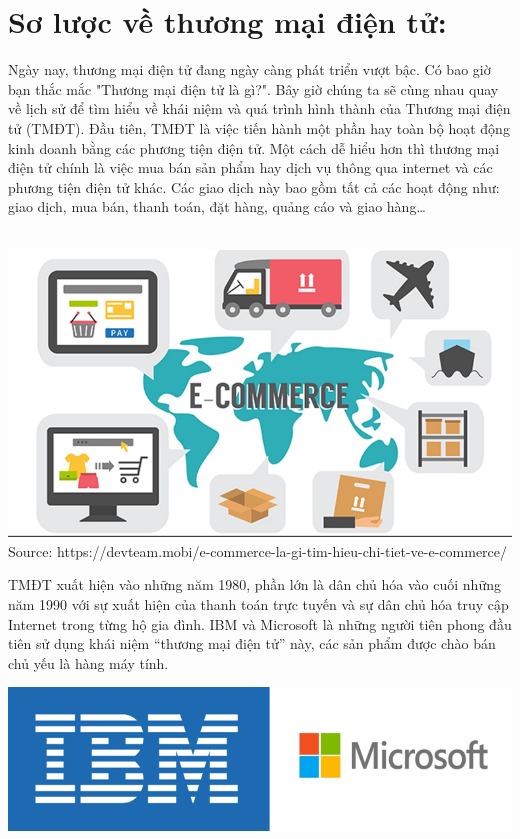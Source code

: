 \documentclass[13pt,a4paper]{article}
\begin{document}
\section{Sơ lược về thương mại điện tử:}
\fontsize{13pt}{1.2pt}\selectfont %
 Ngày nay, thương mại điện tử đang ngày càng phát triển vượt bậc. Có bao giờ bạn thắc mắc "Thương mại điện tử là gì?". Bây giờ chúng ta sẽ cùng nhau quay về lịch sử để tìm hiểu về khái niệm và quá trình hình thành của Thương mại điện tử (TMĐT). Đầu tiên, TMĐT là việc tiến hành một phần hay toàn bộ hoạt động kinh doanh bằng các phương tiện điện tử. Một cách dễ hiểu hơn thì thương mại điện tử chính là việc mua bán sản phẩm hay dịch vụ thông qua internet và các phương tiện điện tử khác. Các giao dịch này bao gồm tất cả các hoạt động như: giao dịch, mua bán, thanh toán, đặt hàng, quảng cáo và giao hàng… \\ \\
\begin{center}
\includegraphics[scale=0.5]{images/e-com.png}\\
\fontsize{10pt}{1.2pt}\selectfont
    Source: https://devteam.mobi/e-commerce-la-gi-tim-hieu-chi-tiet-ve-e-commerce/
\\
\end{center}
TMĐT xuất hiện vào những năm 1980, phần lớn là dân chủ hóa vào cuối những năm 1990 với sự xuất hiện của thanh toán trực tuyến và sự dân chủ hóa truy cập Internet trong từng hộ gia đình.
IBM và Microsoft là những người tiên phong đầu tiên sử dụng khái niệm “thương mại điện tử” này, các sản phẩm được chào bán chủ yếu là hàng máy tính.
\\\begin{center}
\includegraphics[scale=0.5]{images/IBM.png}\\
\end{center}
\end{document}
